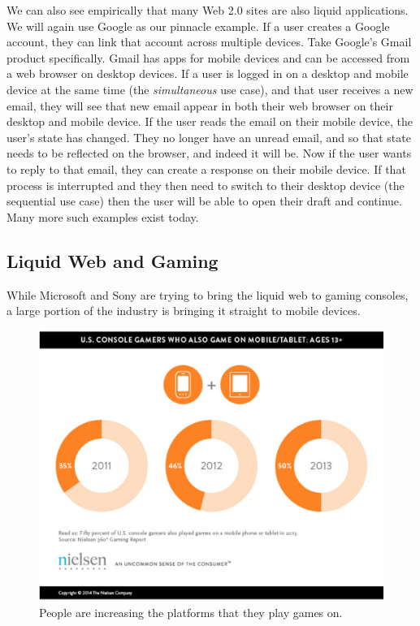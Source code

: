 \documentclass[12pt]{article}
\begin{document}
We can also see empirically that many Web 2.0 sites are also liquid applications.  We will again use Google as our pinnacle example.  If a user creates a Google account, they can link that account across multiple devices.  Take Google's Gmail product specifically.  Gmail has apps for mobile devices and can be accessed from a web browser on desktop devices.  If a user is logged in on a desktop and mobile device at the same time (the \textit{simultaneous} use case), and that user receives a new email, they will see that new email appear in both their web browser on their desktop and mobile device.  If the user reads the email on their mobile device, the user's state has changed.  They no longer have an unread email, and so that state needs to be reflected on the browser, and indeed it will be.  Now if the user wants to reply to that email, they can create a response on their mobile device.  If that process is interrupted and they then need to switch to their desktop device (the sequential use case) then the user will be able to open their draft and continue.  Many more such examples exist today.

\subsection{Liquid Web and Gaming}
While Microsoft and Sony are trying to bring the liquid web to gaming consoles, a large portion of the industry is bringing it straight to mobile devices.

\begin{figure}[H]
  \begin{center}
    \includegraphics[scale=0.3]{nielsan_tablets_games.png}
    \caption{People are increasing the platforms that they play games on.}
    \label{fig:nielsan_games}
  \end{center}
\end{figure}
\end{document}
